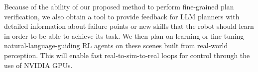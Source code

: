 \documentclass[english,
]{nserc-alliance}
\begin{document}
Because of the ability of our proposed method to perform fine-grained plan verification, we also obtain a tool to provide feedback for LLM planners with detailed information about failure points or new skills that the robot should learn in order to be able to achieve its task. We then plan on learning or fine-tuning natural-language-guiding RL agents on these scenes built from real-world perception. This will enable fast real-to-sim-to-real loops for control through the use of NVIDIA GPUs.


\end{document}
